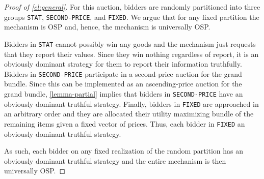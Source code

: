 \begin{proof}[Proof of \cref{cl:general}]
    For this auction, bidders are randomly partitioned into three groups \texttt{STAT}, \texttt{SECOND-PRICE}, and \texttt{FIXED}.  We argue that for any fixed partition the mechanism is OSP and, hence, the mechanism is universally OSP. 
    
    Bidders in \texttt{STAT} cannot possibly win any goods and the mechanism just requests that they report their values.  Since they win nothing regardless of report, it is an obviously dominant strategy for them to report their information truthfully. 
    Bidders in \texttt{SECOND-PRICE} participate in a second-price auction for the grand bundle.  Since this can be implemented as an ascending-price auction for the grand bundle,  \cref{lemma-partial} 
    implies that bidders in \texttt{SECOND-PRICE} have an obviously dominant truthful strategy.  
    Finally, bidders in \texttt{FIXED} are approached in an arbitrary order and they are allocated their utility maximizing bundle of the remaining items given a fixed vector of prices.  
    Thus, 
    each
     bidder in \texttt{FIXED} an obviously dominant truthful strategy.  
    
    As such, each bidder on any fixed realization of the random partition has an obviously dominant truthful strategy and the entire mechanism is then universally OSP.
\end{proof}


